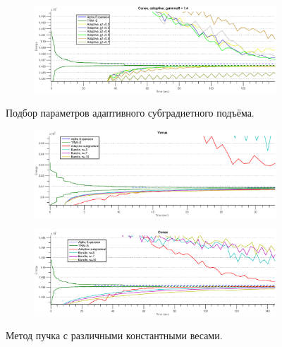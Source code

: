\documentclass{article}
\begin{document}
\begin{figure}
\begin{subfigure}[t]{\textwidth}
            \centering
            \includegraphics[width=\textwidth]{adaptive_g1_cones}
    \end{subfigure}
    \caption{Подбор параметров адаптивного субградиетного подъёма.}
    \label{fig:adaptive_params_extra}
\end{figure}

\begin{figure}
    \centering
    \begin{subfigure}[t]{\textwidth}
            \centering
            \includegraphics[width=\textwidth]{bundle_const_weight_venus}
    \end{subfigure}
    \begin{subfigure}[t]{\textwidth}
            \centering
            \includegraphics[width=\textwidth]{bundle_const_weight_cones}
    \end{subfigure}
    \caption{Метод пучка с различными константными весами.}
    \label{fig:bundle_const_weight_extra}
\end{figure}
\end{document}
